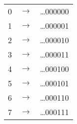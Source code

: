 \documentclass[11pt]{article}
\begin{document}
\begin{tabular}{rcr}
0 & $\rightarrow$ & \ldots 000000 \\
1 & $\rightarrow$ & \ldots 000001 \\
2 & $\rightarrow$ & \ldots 000010 \\
3 & $\rightarrow$ & \ldots 000011 \\
4 & $\rightarrow$ & \ldots 000100 \\
5 & $\rightarrow$ & \ldots 000101 \\
6 & $\rightarrow$ & \ldots 000110 \\
7 & $\rightarrow$ & \ldots 000111 \\
\end{tabular}
\end{document}
